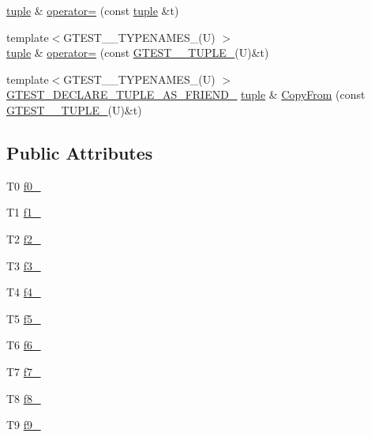 \begin{DoxyCompactItemize}
\item 
\hyperlink{classstd_1_1tr1_1_1tuple}{tuple} \& \hyperlink{classstd_1_1tr1_1_1tuple_ae52bd211e87c30ea7243246fa06bf038}{operator=} (const \hyperlink{classstd_1_1tr1_1_1tuple}{tuple} \&t)
\item 
{\footnotesize template$<$G\+T\+E\+S\+T\+\_\+\_\+\+T\+Y\+P\+E\+N\+A\+M\+E\+S\+\_\+(\+U) $>$ }\\\hyperlink{classstd_1_1tr1_1_1tuple}{tuple} \& \hyperlink{classstd_1_1tr1_1_1tuple_a9ed59ab84e2ff750d0a188c3d9dac819}{operator=} (const \hyperlink{namespacestd_1_1tr1_aa636d3269bf1f368a7bc09ff158bc482}{G\+T\+E\+S\+T\+\_\+\_\+\+T\+U\+P\+L\+E\+\_\+}(U)\&t)
\item 
{\footnotesize template$<$G\+T\+E\+S\+T\+\_\+\_\+\+T\+Y\+P\+E\+N\+A\+M\+E\+S\+\_\+(\+U) $>$ }\\\hyperlink{gtest-tuple_8h_a2b20671273f514a88a6e9b8328e5f257}{G\+T\+E\+S\+T\+\_\+\+D\+E\+C\+L\+A\+R\+E\+\_\+\+T\+U\+P\+L\+E\+\_\+\+A\+S\+\_\+\+F\+R\+I\+E\+N\+D\+\_\+} \hyperlink{classstd_1_1tr1_1_1tuple}{tuple} \& \hyperlink{classstd_1_1tr1_1_1tuple_a3d06fb121d18b6e1c10d14f9e966618d}{Copy\+From} (const \hyperlink{namespacestd_1_1tr1_aa636d3269bf1f368a7bc09ff158bc482}{G\+T\+E\+S\+T\+\_\+\_\+\+T\+U\+P\+L\+E\+\_\+}(U)\&t)
\end{DoxyCompactItemize}
\subsection*{Public Attributes}
\begin{DoxyCompactItemize}
\item 
T0 \hyperlink{classstd_1_1tr1_1_1tuple_a771b1d99e8800fb284acd04bca838cbb}{f0\+\_\+}
\item 
T1 \hyperlink{classstd_1_1tr1_1_1tuple_a7cccf899dedc626c51fa4f6921d0ac52}{f1\+\_\+}
\item 
T2 \hyperlink{classstd_1_1tr1_1_1tuple_aaec06c27366502dc332ef96878628f84}{f2\+\_\+}
\item 
T3 \hyperlink{classstd_1_1tr1_1_1tuple_ad4d3673e0d5c07c392c02e335fe978ff}{f3\+\_\+}
\item 
T4 \hyperlink{classstd_1_1tr1_1_1tuple_ab662f1051c2302d065796383848db6c4}{f4\+\_\+}
\item 
T5 \hyperlink{classstd_1_1tr1_1_1tuple_a32d8cd6f180c0a77d83733fc65423657}{f5\+\_\+}
\item 
T6 \hyperlink{classstd_1_1tr1_1_1tuple_a597beab3af3f95c84408491ab14632b0}{f6\+\_\+}
\item 
T7 \hyperlink{classstd_1_1tr1_1_1tuple_a7c28780e616d382833e844f62672c6bc}{f7\+\_\+}
\item 
T8 \hyperlink{classstd_1_1tr1_1_1tuple_ae859012c83943e54e035a4a32089ccb6}{f8\+\_\+}
\item 
T9 \hyperlink{classstd_1_1tr1_1_1tuple_a336d5e582fd34e45ec88c78d473671dd}{f9\+\_\+}
\end{DoxyCompactItemize}
